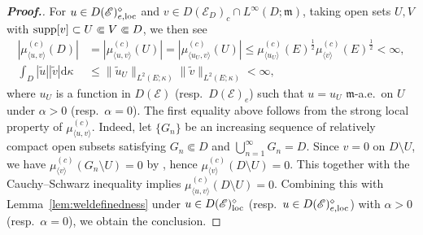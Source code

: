 \documentclass[12pt,a4paper]{article}
\renewcommand{\d}{\mathrm{d}}
\newcommand{\m}{\mathfrak{m} }
\newcommand{\loc}{{\rm loc}}
\newcommand{\1}{{\bf 1}}
\begin{document}
\begin{proof}[{\bf Proof.}]
For $u\in D(\mathscr{E})_{e,\loc}^{\diamond}$ and $v\in D(\mathscr{E}_D)_c\cap L^{\infty}(D;{\m})$, taking open sets
$U,V$ with  ${\rm supp}[v]\subset U\Subset V\Subset D$, we then see 
\begin{align*}
|\mu^{(c)}_{\langle u,v\rangle}(D)|&=
|\mu^{(c)}_{\langle u,v\rangle}(U)|=|\mu^{(c)}_{\langle u_U,v\rangle}(U)|\leq 
\mu^{(c)}_{\langle u_U\rangle}(E)^{\frac12}\mu^{(c)}_{\langle v\rangle}(E)^{\frac12}<\infty,\\
 \int_D|\tilde{u}||\tilde{v}|{\d}\kappa&\leq \|\tilde{u}_U\|_{L^2(E;\kappa)}\|\tilde{v}\|_{L^2(E;\kappa)}<\infty,
\end{align*}
where $u_U$ is a function in $D(\mathscr{E})$ (resp.~$D(\mathscr{E})_e$) such that $u=u_U$ ${\m}$-a.e.~on $U$ under $\alpha>0$ (resp.~$\alpha=0$). 
The first equality above follows from the strong local property of $\mu_{\langle u,v\rangle}^{(c)}$. Indeed, let $\{G_n\}$ be an increasing sequence of relatively compact open subsets satisfying $G_n\Subset D$ and $\bigcup_{n=1}^{\infty}G_n=D$. Since $v=0$ on $D\setminus U$, we have  
$\mu^{(c)}_{\langle v\rangle}(G_n\setminus U)=0$ by \cite[Corollary~3.2.1]{FOT}, hence $\mu^{(c)}_{\langle v\rangle}(D\setminus U)=0$. This together with the Cauchy--Schwarz inequality implies $\mu^{(c)}_{\langle u,v\rangle}(D\setminus U)=0$. 
 Combining this with Lemma~\ref{lem:weldefinedness} under 
 $u\in D(\mathscr{E})^{\diamond}_{\loc}$ (resp.~$u\in D(\mathscr{E})_{e,\loc}^{\diamond}$) with $\alpha>0$ (resp.~$\alpha=0$),  
we obtain the conclusion. 
\end{proof}
\end{document}
